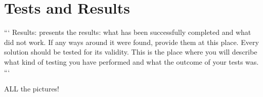\section{Tests and Results}

```
Results: presents the results: what has been successfully completed and what did not work.
If any ways around it were found, provide them at this place. Every solution should be tested for its validity.
This is the place where you will describe what kind of testing you have performed and what the outcome of your tests was.
```

ALL the pictures!
